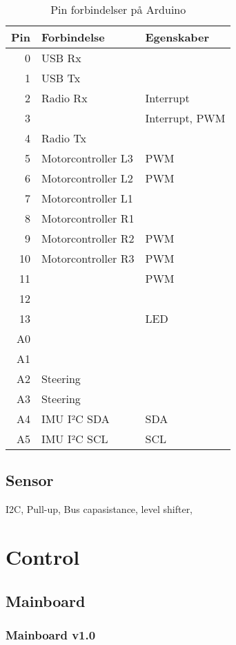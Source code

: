 \documentclass[a4paper,oneside,article,danish,table,draft]{memoir}
\begin{document}
\begin{table}[htbp]
  \caption[]{Pin forbindelser på Arduino}
  \centering
  \begin{tabular}{rll}
      \toprule
      Pin & Forbindelse & Egenskaber\\
      \midrule
      0 & USB Rx & \\
      1 & USB Tx & \\
      2 & Radio Rx & Interrupt\\
      3 & & Interrupt, PWM\\
      4 & Radio Tx & \\
      5 & Motorcontroller L3 & PWM\\
      6 & Motorcontroller L2 & PWM\\
      7 & Motorcontroller L1 & \\
      8 & Motorcontroller R1 & \\
      9 & Motorcontroller R2 & PWM\\
      10 & Motorcontroller R3 & PWM\\
      11 & & PWM\\
      12 & & \\
      13 & & LED\\
      A0 & & \\
      A1 & & \\
      A2 & Steering & \\
      A3 & Steering & \\
      A4 & IMU I²C SDA & SDA\\
      A5 & IMU I²C SCL & SCL
    \end{tabular}
  \end{table}

\subsection{Sensor}
I2C, Pull-up, Bus capasistance, level shifter,

\section{Control}

\subsection{Mainboard}

\subsubsection{Mainboard v1.0}
\end{document}
